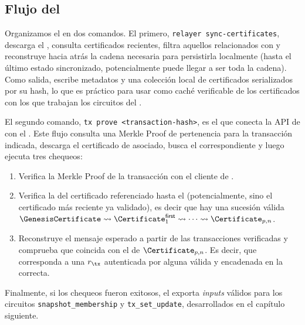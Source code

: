 \subsection{Flujo del \ZkBridgeOperator}

Organizamos el \ZkBridgeOperator en dos comandos. El primero, \texttt{relayer sync-certificates}, descarga el \GenesisCertificate, consulta certificados recientes, filtra aquellos relacionados con \MithrilStakeDistribution y reconstruye hacia atrás la cadena necesaria para persistirla localmente (hasta el último estado sincronizado, potencialmente puede llegar a ser toda la cadena). Como salida, escribe metadatos y una colección local de certificados serializados por su hash, lo que es práctico para usar como caché verificable de los certificados con los que trabajan los circuitos del \zkBridge.

El segundo comando, \texttt{tx prove <transaction-hash>}, es el que conecta la API de \Mithril con el \zkBridge. Este flujo consulta una Merkle Proof de pertenencia para la transacción indicada, descarga el certificado de \CardanoTransactions asociado, busca el \Snapshot correspondiente y luego ejecuta tres chequeos:

\begin{enumerate}[noitemsep]
	\item Verifica la Merkle Proof de la transacción con el cliente de \Mithril.
	\item Verifica la \CertificateChain del certificado referenciado hasta el \GenesisCertificate (potencialmente, sino el certificado más reciente ya validado), es decir que hay una sucesión válida $\GenesisCertificate \rightsquigarrow \Certificate^{\mathsf{first}}_1 \rightsquigarrow \cdots \rightsquigarrow \Certificate_{p,n}$.
	\item Reconstruye el mensaje esperado \ProtocolMsg a partir de las transacciones verificadas y comprueba que coincida con el de $\Certificate_{p,n}$. Es decir, que corresponda a una $r_\tx$ autenticada por alguna \AVK válida y encadenada en la \CertificateChain correcta.
\end{enumerate}

Finalmente, si los chequeos fueron exitosos, el \ZkBridgeOperator exporta \textit{inputs} válidos para los circuitos \texttt{snapshot\_membership} y \texttt{tx\_set\_update}, desarrollados en el capítulo siguiente.
